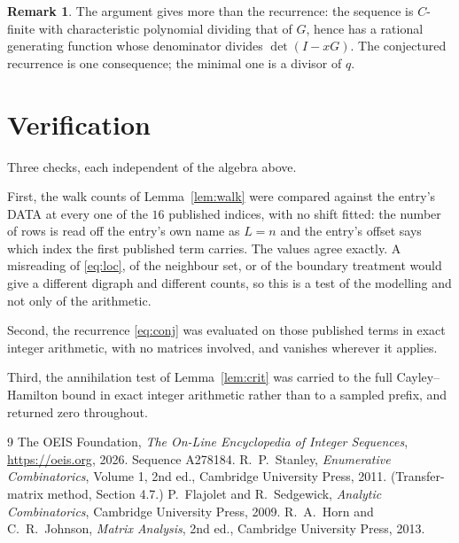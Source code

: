 \documentclass[11pt,a4paper]{article}
\theoremstyle{plain}
\theoremstyle{definition}
\newtheorem{remark}[theorem]{Remark}
\begin{document}
\begin{remark}
The argument gives more than the recurrence: the sequence is $C$-finite with characteristic
polynomial dividing that of $G$, hence has a rational generating function whose denominator
divides $\det(I-xG)$. The conjectured recurrence is one consequence; the minimal one is a
divisor of $q$.
\end{remark}

\section{Verification}

Three checks, each independent of the algebra above.

First, the walk counts of Lemma~\ref{lem:walk} were compared against the entry's DATA at
every one of the $16$ published indices, with no shift fitted: the number of rows is
read off the entry's own name as $L=n$ and the entry's offset says which index the first
published term carries. The values agree exactly. A misreading of \eqref{eq:loc}, of the
neighbour set, or of the boundary treatment would give a different digraph and different
counts, so this is a test of the modelling and not only of the arithmetic.

Second, the recurrence \eqref{eq:conj} was evaluated on those published terms in exact
integer arithmetic, with no matrices involved, and vanishes wherever it applies.

Third, the annihilation test of Lemma~\ref{lem:crit} was carried to the full
Cayley--Hamilton bound in exact integer arithmetic rather than to a sampled prefix, and
returned zero throughout.

\begin{thebibliography}{9}
 The OEIS Foundation, \emph{The On-Line Encyclopedia of Integer
Sequences}, \url{https://oeis.org}, 2026. Sequence A278184.
 R.~P.~Stanley, \emph{Enumerative Combinatorics}, Volume 1, 2nd ed.,
Cambridge University Press, 2011. (Transfer-matrix method, Section 4.7.)
 P.~Flajolet and R.~Sedgewick, \emph{Analytic Combinatorics}, Cambridge
University Press, 2009.
 R.~A.~Horn and C.~R.~Johnson, \emph{Matrix Analysis}, 2nd ed., Cambridge
University Press, 2013.
\end{thebibliography}
\end{document}

